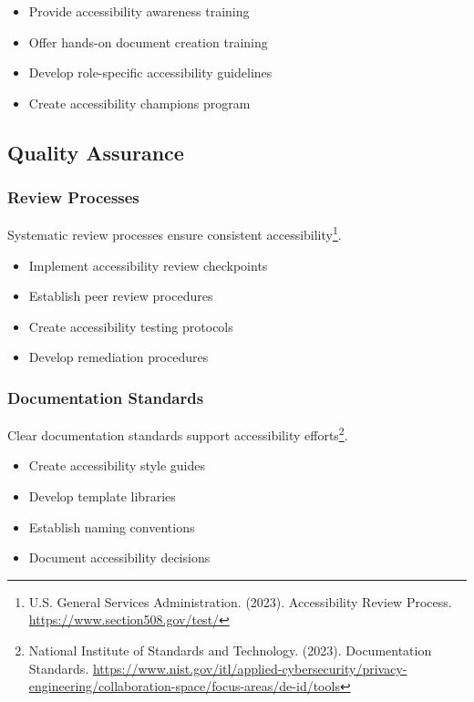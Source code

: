 \begin{itemize}
\item Provide accessibility awareness training
\item Offer hands-on document creation training
\item Develop role-specific accessibility guidelines
\item Create accessibility champions program
\end{itemize}

\subsection{Quality Assurance}

\subsubsection{Review Processes}
Systematic review processes ensure consistent accessibility\footnote{U.S. General Services Administration. (2023). Accessibility Review Process. \url{https://www.section508.gov/test/}}.

\begin{itemize}
\item Implement accessibility review checkpoints
\item Establish peer review procedures
\item Create accessibility testing protocols
\item Develop remediation procedures
\end{itemize}

\subsubsection{Documentation Standards}
Clear documentation standards support accessibility efforts\footnote{National Institute of Standards and Technology. (2023). Documentation Standards. \url{https://www.nist.gov/itl/applied-cybersecurity/privacy-engineering/collaboration-space/focus-areas/de-id/tools}}.

\begin{itemize}
\item Create accessibility style guides
\item Develop template libraries
\item Establish naming conventions
\item Document accessibility decisions
\end{itemize}

